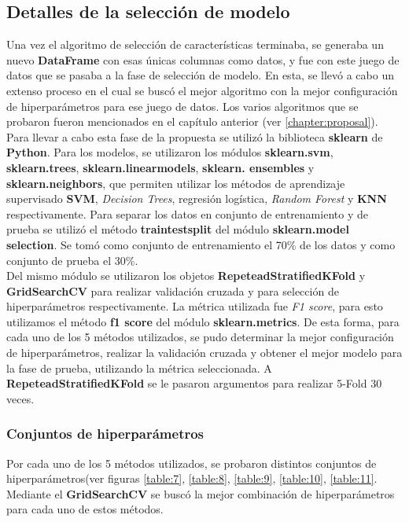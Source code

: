 	\subsection{Detalles de la selección de modelo}
		Una vez el algoritmo de selección de características terminaba, se generaba un nuevo \textbf{DataFrame} con esas únicas columnas como datos,
		y fue con este juego de datos que se pasaba a la fase de selección de modelo. En esta, se llevó a cabo un extenso proceso en el cual se buscó
		el mejor algoritmo con la mejor configuración de hiperparámetros para ese juego de datos. Los varios algoritmos que se probaron fueron
		mencionados en el capítulo anterior (ver \ref {chapter:proposal}).\\
		\indent Para llevar a cabo esta fase de la propuesta se utilizó la biblioteca \textbf{sklearn} de \textbf{Python}.
		Para los modelos, se utilizaron los módulos \textbf{sklearn.svm}, \textbf{sklearn.trees}, \textbf{sklearn.linear\textunderscore models},
		\textbf{sklearn. ensembles} y \textbf{sklearn.neighbors}, que permiten utilizar los métodos de aprendizaje supervisado \textbf{SVM}, \emph
		{Decision Trees}, regresión logística, \emph{Random Forest} y \textbf{KNN} respectivamente. Para separar los datos en conjunto de entrenamiento
		y de prueba se utilizó el método \textbf{train\textunderscore test\textunderscore split} del módulo \textbf{sklearn.model\textunderscore
		selection}. Se tomó como  conjunto de entrenamiento el 70\% de los datos y como conjunto de prueba el 30\%.\\
		\indent Del mismo módulo se utilizaron los objetos \textbf {RepeteadStratifiedKFold} y \textbf{GridSearchCV} para realizar validación cruzada y
		para selección de hiperparámetros respectivamente. La métrica utilizada fue \emph{F1 score}, para esto utilizamos el método \textbf{f1\textunderscore
		score} del módulo \textbf{sklearn.metrics}. De esta forma, para cada uno de los 5 métodos utilizados, se pudo determinar la mejor configuración
		de hiperparámetros, realizar la validación cruzada y obtener el mejor modelo para la fase de prueba, utilizando la métrica seleccionada. A \textbf{
		RepeteadStratifiedKFold} se le pasaron argumentos para realizar 5-Fold 30 veces.

		\subsubsection{Conjuntos de hiperparámetros}
			Por cada uno de los 5 métodos utilizados, se probaron distintos conjuntos de hiperparámetros(ver figuras \ref{table:7}, \ref{table:8},
			\ref{table:9}, \ref{table:10}, \ref{table:11}. Mediante el  \textbf{GridSearchCV} se buscó la mejor combinación de hiperparámetros 
			para cada uno de estos métodos.

